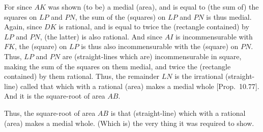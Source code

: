 \begin{Parallel}{}{}
{For since $AK$ was shown (to be) a medial (area), and is equal to (the sum of) the squares on $LP$ and $PN$, the sum of the (squares) on $LP$
and $PN$ is thus medial. Again, since $DK$ is rational, and
is equal to twice the (rectangle contained) by $LP$ and $PN$,  (the latter) is also
rational. And since $AI$ is incommensurable with $FK$, the (square) on
$LP$ is thus also incommensurable with the (square) on $PN$. Thus,
$LP$ and $PN$ are (straight-lines which are) incommensurable in square, making the
sum of the squares on them medial, and twice the (rectangle contained) by
them rational. Thus, the remainder $LN$ is the irrational (straight-line)
called that which with a rational (area) makes a medial whole [Prop.~10.77].
And it is the square-root of area $AB$.

Thus, the square-root of area $AB$ is that (straight-line) which with a rational (area) makes a medial whole. (Which is) the very thing it was required to show.}
\end{Parallel}

